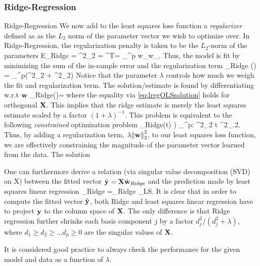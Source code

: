 \subsubsection{Ridge-Regression}
\begin{mybox}{Ridge-Regression}
	We now add to the least squares loss function a \emph{regularizer} defined as as the $L_2$ norm of the parameter vector we wish to optimize over. In Ridge-Regression, the regularization penalty is taken to be the $L_2$-norm of the parameters 
	\be 
	E_{Ridge} = \lambda \norm{\mw}^2_2 = \lambda \mw^T\mw = \lambda \sum_{}^p w_\gamma w_\gamma.
	\ee 
	Thus, the model is fit by minimizing the sum of the in-sample error and the regularization term
	\be 
	\label{eq:lregRidge}
	\hat{\mw}_{Ridge} (\lambda) = \arg \min_{\mw \in \mR^p}\left(\norm{\mX \mw - \my}^2_2 + \lambda \norm{\mw}^2_2\right)
	\ee 
	Notice that the parameter $\lambda$ controls how much we weigh the fit and regularization term.
	The solution/estimate is found by differentiating w.r.t $\mathbf{w}$
	\be 
	\label{eq:lregRidgeSol}
	\hat{\mw}_{Ridge}(\lambda)= 
	\ee 
	where the  equality via \ref{eq:lregOLSsolution} holds for orthogonal $\mathbf{X}$. This implies that the ridge estimate is merely the least squares estimate scaled by a factor $(1+\lambda)^{-1}$.
	This problem is equivalent to the following \emph{constrained} optimization problem
	\be 
	\hat{\mw}_{Ridge}(t) ) \arg \min_{\mw \in \mR^p: \norm{\mw}^2_2 \leq t} \norm{\mX \mw -\my}^2_.2.
	\ee 
	Thus, by adding a regularization term, $\lambda \norm{\mathbf{w}}^2_2$, to our least squares loss function, we are effectively constraining the magnitude of the parameter vector learned from the data. The solution
\end{mybox}
One can furthermore derive a relation (via singular value decomposition (SVD) on X) between the fitted vector $\hat{\mathbf{y}}=\mathbf{X}\hat{\mathbf{w}}_{Ridge}$ and the prediction made by least squares linear regression
\be 
{}_{Ridge} =\mX \hat{\mw}_{Ridge} \leq \mX \hat{\my} \equiv \hat{\my}_{LS}.
\ee 
It is clear that in order to compute the fitted vector $\hat{\mathbf{y}}$, both Ridge and least squares linear regression have to project $\mathbf{y}$ to the column space of $\mathbf{X}$. The only difference is that Ridge regression further shrinks each basis component $j$ by a factor $d^2_j/(d^2_j+\lambda)$, where $d_1\geq d_2\geq \dots d_p \geq 0$ are the singular values of $\mathbf{X}$.
\begin{mybox}{}
	It is considered good practice to always check the performance for the given model and data as a function of $\lambda$.
\end{mybox}

